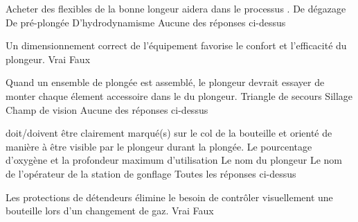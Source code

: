 \documentclass[english,12pt,a4paper]{article}
\begin{document}
\begin{outline}
		\1 Acheter des flexibles de la bonne longeur aidera dans	le processus \underline{\hspace{1.5cm}}.
			\2 De dégazage
			\2 De pré-plongée
			\2 D'hydrodynamisme
			\2 Aucune des réponses ci-dessus

		\1 Un dimensionnement correct de l'équipement favorise le confort et l'efficacité du plongeur.
			\2 Vrai
			\2 Faux

		\1 Quand un ensemble de plongée est assemblé, le plongeur devrait essayer de monter chaque élement accessoire dans le \underline{\hspace{1.5cm}} du plongeur.
			\2 Triangle de secours
			\2 Sillage
			\2 Champ de vision
			\2 Aucune des réponses ci-dessus

		\1 \underline{\hspace{1.5cm}} doit/doivent être clairement marqué(s) sur le col de la bouteille et orienté de manière à être visible par le plongeur durant la plongée.
			\2 Le pourcentage d'oxygène et la profondeur maximum d'utilisation
			\2 Le nom du plongeur
			\2 Le nom de l'opérateur de la station de gonflage
			\2 Toutes les réponses ci-dessus

		\1 Les protections de détendeurs élimine le besoin de contrôler visuellement une bouteille lors d'un changement de gaz.
			\2 Vrai
			\2 Faux
	\end{outline}
	\pagebreak

\end{document}

